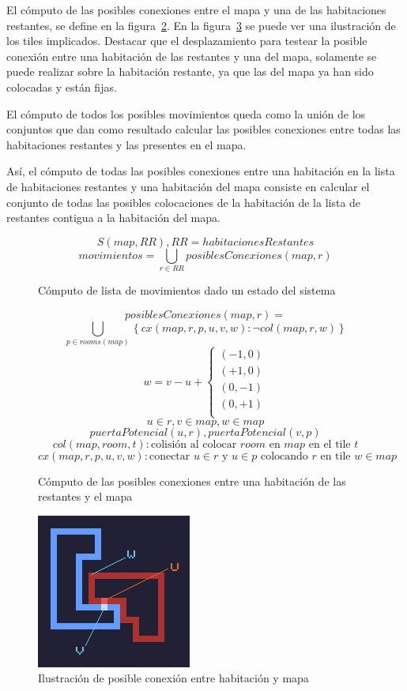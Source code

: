 El cómputo de las posibles conexiones entre el mapa y una de las habitaciones restantes, se define en la figura~\ref{fig:poscons}. En la figura~\ref{fig:grafhabmap} se puede ver una ilustración de los tiles implicados. Destacar que el desplazamiento para testear la posible conexión entre una habitación de las restantes y una del mapa, solamente se puede realizar sobre la habitación restante, ya que las del mapa ya han sido colocadas y están fijas.


El cómputo de todos los posibles movimientos queda como la unión de los conjuntos que dan como resultado calcular las posibles conexiones entre todas las habitaciones restantes y las presentes en el mapa.

Así, el cómputo de todas las posibles conexiones entre una habitación en la lista de habitaciones restantes y una habitación del mapa consiste en calcular el conjunto de todas las posibles colocaciones de la habitación de la lista de restantes contigua a la habitación del mapa.


\begin{figure}[h]
\centering
{
	$$S(map, RR), RR = habitacionesRestantes$$
	$$movimientos = \bigcup_{r \in RR}posiblesConexiones(map, r)$$
}
\caption{Cómputo de lista de movimientos dado un estado del sistema
\label{fig:posmovs}
}
\end{figure}



\begin{figure}[H]
	$$posiblesConexiones(map, r) = $$
	$$\bigcup_{p \in rooms(map)}  \left\{ cx(map,r,p,u,v,w) : \neg col(map, r, w) \right\}$$
	$$w = v - u + \begin{cases}
		(-1,0) \\
		(+1,0) \\
		(0,-1) \\
		(0,+1) \\
	\end{cases}$$
	$$u \in r, v \in map, w \in map$$
	$$puertaPotencial(u, r), puertaPotencial(v, p)$$
	$$col(map, room, t) : \text{colisión al colocar $room$ en $map$ en el tile $t$}$$
	$$cx(map,r,p,u,v,w) : \text{conectar $u \in r$ y $u \in p$ colocando $r$ en tile $w \in map$}$$
\caption{Cómputo de las posibles conexiones entre una habitación de las restantes y el mapa
\label{fig:poscons}
}
\end{figure}


\begin{figure}[H]
\centering
\includegraphics[scale=1]{img/tileconn}
\caption{Ilustración de posible conexión entre habitación y mapa
\label{fig:grafhabmap}}
\end{figure}



